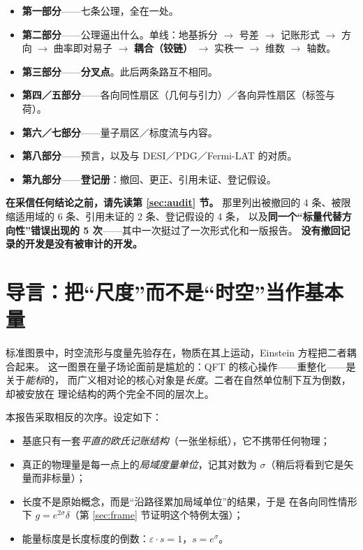 \documentclass[11pt,a4paper]{article}
\theoremstyle{sudef}
\newcommand{\kron}{\delta}
\begin{document}
\begin{itemize}[leftmargin=1.6em,itemsep=2pt]
\item \textbf{第一部分}——七条公理，全在一处。
\item \textbf{第二部分}——公理逼出什么。单线：地基拆分 $\to$ 号差 $\to$ 记账形式
      $\to$ 方向 $\to$ 曲率即对易子 $\to$ \textbf{耦合（铰链）} $\to$ 实秩一
      $\to$ 维数 $\to$ 轴数。
\item \textbf{第三部分}——\textbf{分叉点}。此后两条路互不相同。
\item \textbf{第四／五部分}——各向同性扇区（几何与引力）／各向异性扇区（标签与荷）。
\item \textbf{第六／七部分}——量子扇区／标度流与内容。
\item \textbf{第八部分}——预言，以及与 DESI／PDG／Fermi-LAT 的对质。
\item \textbf{第九部分}——\textbf{登记册}：撤回、更正、引用未证、登记假设。
\end{itemize}

\begin{mdframed}[linecolor=red!60!black,linewidth=1pt,backgroundcolor=red!3]
\textbf{在采信任何结论之前，请先读第 \ref{sec:audit} 节。}
那里列出被撤回的 4 条、被限缩适用域的 6 条、引用未证的 2 条、登记假设的 4 条，
以及\textbf{同一个“标量代替方向性”错误出现的 5 次}——其中一次挺过了一次形式化和一版报告。
\textbf{没有撤回记录的开发是没有被审计的开发。}
\end{mdframed}

\tableofcontents

\section{导言：把“尺度”而不是“时空”当作基本量}

标准图景中，时空流形与度量先验存在，物质在其上运动，Einstein 方程把二者耦合起来。
这一图景在量子场论面前是尴尬的：QFT 的核心操作——重整化——是关于\emph{能标}的，
而广义相对论的核心对象是\emph{长度}。二者在自然单位制下互为倒数，却被安放在
理论结构的两个完全不同的层次上。

本报告采取相反的次序。设定如下：

\begin{itemize}[leftmargin=1.6em]
\item 基底只有一套\emph{平直的欧氏记账结构}（一张坐标纸），它不携带任何物理；
\item 真正的物理量是每一点上的\emph{局域度量单位}，记其对数为 $\sigma$（稍后将看到它是矢量而非标量）；
\item 长度不是原始概念，而是“沿路径累加局域单位”的结果，于是
      在各向同性情形下 $g=e^{2\sigma}\kron$（第 \ref{sec:frame} 节证明这个特例太强）；
\item 能量标度是长度标度的倒数：$\varepsilon\cdot s=1$，$s=e^{\sigma}$。
\end{itemize}
\end{document}
